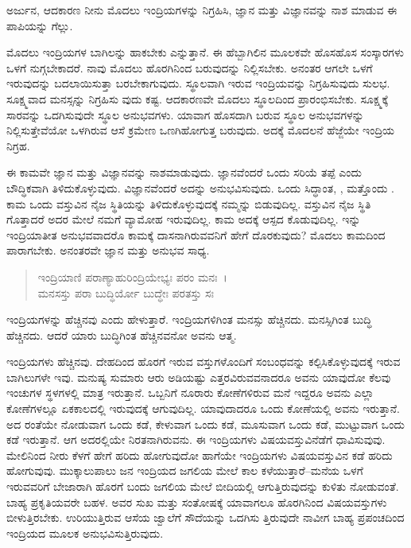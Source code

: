 {\small ಅರ್ಜುನ, ಆದಕಾರಣ ನೀನು ಮೊದಲು ಇಂದ್ರಿಯಗಳನ್ನು ನಿಗ್ರಹಿಸಿ, ಜ್ಞಾನ ಮತ್ತು ವಿಜ್ಞಾನವನ್ನು ನಾಶ ಮಾಡುವ ಈ ಪಾಪಿಯನ್ನು ಗೆಲ್ಲು.}

ಮೊದಲು ಇಂದ್ರಿಯಗಳ ಬಾಗಿಲನ್ನು ಹಾಕಬೇಕು ಎನ್ನುತ್ತಾನೆ. ಈ ಹೆಬ್ಬಾಗಿಲಿನ ಮೂಲಕವೇ ಹೊಸಹೊಸ ಸಂಸ್ಕಾರಗಳು ಒಳಗೆ ನುಗ್ಗಬೇಕಾದರೆ. ನಾವು ಮೊದಲು ಹೊರಗಿನಿಂದ ಬರುವುದನ್ನು ನಿಲ್ಲಿಸಬೇಕು. ಅನಂತರ ಆಗಲೇ ಒಳಗೆ ಇರುವುದನ್ನು ಬದಲಾಯಿಸುತ್ತಾ ಬರಬೇಕಾಗುವುದು. ಸ್ಥೂಲವಾಗಿ ಇರುವ ಇಂದ್ರಿಯವನ್ನು ನಿಗ್ರಹಿಸುವುದು ಸುಲಭ. ಸೂಕ್ಷ್ಮವಾದ ಮನಸ್ಸನ್ನು ನಿಗ್ರಹಿಸು ವುದು ಕಷ್ಟ. ಆದಕಾರಣವೇ ಮೊದಲು ಸ್ಥೂಲದಿಂದ ಪ್ರಾರಂಭಿಸಬೇಕು. ಸೂಕ್ಷ್ಮಕ್ಕೆ ಸಾರವನ್ನು ಒದಗಿಸುವುದೇ ಸ್ಥೂಲ ಅನುಭವಗಳು. ಯಾವಾಗ ಹೊಸದಾಗಿ ಬರುವ ಸ್ಥೂಲ ಅನುಭವಗಳನ್ನು ನಿಲ್ಲಿಸುತ್ತೇವೆಯೋ ಒಳಗಿರುವ ಆಸೆ ಕ್ರಮೇಣ ಒಣಗಿಹೋಗುತ್ತ ಬರುವುದು. ಅದಕ್ಕೆ ಮೊದಲನೆ ಹೆಜ್ಜೆಯೇ ಇಂದ್ರಿಯ ನಿಗ್ರಹ.

ಈ ಕಾಮವೇ ಜ್ಞಾನ ಮತ್ತು ವಿಜ್ಞಾನವನ್ನು ನಾಶಮಾಡುವುದು. ಜ್ಞಾನವೆಂದರೆ ಒಂದು ಸರಿಯೆ ತಪ್ಪೆ ಎಂದು ಬೌದ್ಧಿಕವಾಗಿ ತಿಳಿದುಕೊಳ್ಳುವುದು. ವಿಜ್ಞಾನವೆಂದರೆ ಅದನ್ನು ಅನುಭವಿಸುವುದು. ಒಂದು ಸಿದ್ಧಾಂತ, , ಮತ್ತೊಂದು . ಕಾಮ ಒಂದು ವಸ್ತುವಿನ ನೈಜ ಸ್ಥಿತಿಯನ್ನು ತಿಳಿದುಕೊಳ್ಳುವುದಕ್ಕೆ ನಮ್ಮನ್ನು ಬಿಡುವುದಿಲ್ಲ. ವಸ್ತುವಿನ ನೈಜ ಸ್ಥಿತಿ ಗೊತ್ತಾದರೆ ಅದರ ಮೇಲೆ ನಮಗೆ ವ್ಯಾಮೋಹ ಇರುವುದಿಲ್ಲ. ಕಾಮ ಅದಕ್ಕೆ ಆಸ್ಪದ ಕೊಡುವುದಿಲ್ಲ. ಇನ್ನು ಇಂದ್ರಿಯಾತೀತ ಅನುಭವವಾದರೊ ಕಾಮಕ್ಕೆ ದಾಸನಾಗಿರುವವನಿಗೆ ಹೇಗೆ ದೊರಕುವುದು? ಮೊದಲು ಕಾಮದಿಂದ ಪಾರಾಗಬೇಕು. ಅನಂತರವೇ ಜ್ಞಾನ ಮತ್ತು ಅನುಭವ ಸಾಧ್ಯ.

\begin{verse}
ಇಂದ್ರಿಯಾಣಿ ಪರಾಣ್ಯಾಹುರಿಂದ್ರಿಯೇಭ್ಯಃ ಪರಂ ಮನಃ~।\\ಮನಸಸ್ತು ಪರಾ ಬುದ್ಧಿರ್ಯೋ ಬುದ್ಧೇಃ ಪರತಸ್ತು ಸಃ 
\end{verse}

{\small ಇಂದ್ರಿಯಗಳನ್ನು ಹೆಚ್ಚಿನವು ಎಂದು ಹೇಳುತ್ತಾರೆ. ಇಂದ್ರಿಯಗಳಿಗಿಂತ ಮನಸ್ಸು ಹೆಚ್ಚಿನದು. ಮನಸ್ಸಿಗಿಂತ ಬುದ್ಧಿ ಹೆಚ್ಚಿನದು. ಆದರೆ ಯಾರು ಬುದ್ಧಿಗಿಂತ ಹೆಚ್ಚಿನವನೋ ಅವನು ಆತ್ಮ.}

ಇಂದ್ರಿಯಗಳು ಹೆಚ್ಚಿನವು. ದೇಹದಿಂದ ಹೊರಗೆ ಇರುವ ವಸ್ತುಗಳೊಂದಿಗೆ ಸಂಬಂಧವನ್ನು ಕಲ್ಪಿಸಿಕೊಳ್ಳುವುದಕ್ಕೆ ಇರುವ ಬಾಗಿಲುಗಳೇ ಇವು. ಮನುಷ್ಯ ಸುಮಾರು ಆರು ಅಡಿಯಷ್ಟು ಎತ್ತರವಿರುವವನಾದರೂ ಅವನು ಯಾವುದೋ ಕೆಲವು ಇಂಚುಗಳ ಸ್ಥಳಗಳಲ್ಲಿ ಮಾತ್ರ ಇರುತ್ತಾನೆ. ಒಬ್ಬನಿಗೆ ನೂರಾರು ಕೋಣೆಗಳಿರುವ ಮನೆ ಇದ್ದರೂ ಅವನು ಎಲ್ಲಾ ಕೋಣೆಗಳಲ್ಲೂ ಏಕಕಾಲದಲ್ಲಿ ಇರುವುದಕ್ಕೆ ಆಗುವುದಿಲ್ಲ. ಯಾವುದಾದರೂ ಒಂದು ಕೋಣೆಯಲ್ಲಿ ಅವನು ಇರುತ್ತಾನೆ. ಅದ ರಂತೆಯೇ ನೋಡುವಾಗ ಒಂದು ಕಡೆ, ಕೇಳುವಾಗ ಒಂದು ಕಡೆ, ಮೂಸುವಾಗ ಒಂದು ಕಡೆ, ಮುಟ್ಟುವಾಗ ಒಂದು ಕಡೆ ಇರುತ್ತಾನೆ. ಆಗ ಅದರಲ್ಲಿಯೇ ನಿರತನಾಗಿರುವನು. ಈ ಇಂದ್ರಿಯಗಳು ವಿಷಯವಸ್ತುವಿನೆಡೆಗೆ ಧಾವಿಸುವುವು. ಮೇಲಿನಿಂದ ನೀರು ಕೆಳಗೆ ಹೇಗೆ ಹರಿದು ಹೋಗುವುದೋ ಹಾಗೆಯೇ ಇಂದ್ರಿಯಗಳು ವಿಷಯವಸ್ತುವಿನ ಕಡೆ ಹರಿದು ಹೋಗುವುವು. ಮುಕ್ಕಾಲುಪಾಲು ಜನ ಇಂದ್ರಿಯದ ಜಗಲಿಯ ಮೇಲೆ ಕಾಲ ಕಳೆಯುತ್ತಾರೆ–ಮನೆಯ ಒಳಗೆ ಇರುವವರಿಗೆ ಬೇಜಾರಾಗಿ ಹೊರಗೆ ಬಂದು ಜಗಲಿಯ ಮೇಲೆ ಬೀದಿಯಲ್ಲಿ ಆಗುತ್ತಿರುವುದನ್ನು ಕುಳಿತು ನೋಡುವಂತೆ. ಬಾಹ್ಯ ಪ್ರಕೃತಿಯವರೇ ಬಹಳ. ಅವರ ಸುಖ ಮತ್ತು ಸಂತೋಷಕ್ಕೆ ಯಾವಾಗಲೂ ಹೊರಗಿನಿಂದ ವಿಷಯವಸ್ತುಗಳು ಬೀಳುತ್ತಿರಬೇಕು. ಉರಿಯುತ್ತಿರುವ ಆಸೆಯ ಜ್ವಾಲೆಗೆ ಸೌದೆಯನ್ನು ಒದಗಿಸು ತ್ತಿರುವುದೇ ನಾವೀಗ ಬಾಹ್ಯ ಪ್ರಪಂಚದಿಂದ ಇಂದ್ರಿಯದ ಮೂಲಕ ಅನುಭವಿಸುತ್ತಿರುವುದು.

